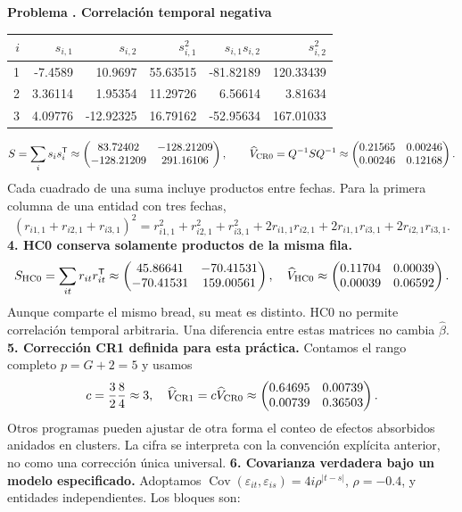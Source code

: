 \documentclass[11pt,a4paper]{article}
\newcommand{\T}{^{\mathsf T}}
\DeclareMathOperator{\Cov}{Cov}
\theoremstyle{definition}
\newcounter{problema}
\newenvironment{resuelto}[1]{\refstepcounter{problema}\par\medskip\Needspace{6\baselineskip}\textbf{Problema \theproblema. #1}\par}{\par\medskip}
\newcommand{\eps}{\varepsilon}
\begin{document}
\begin{resuelto}{Correlación temporal negativa}
\begin{center}\small
\begin{tabular}{rrrrrr}
\toprule
$i$&$s_{i,1}$&$s_{i,2}$&$s_{i,1}^2$&$s_{i,1}s_{i,2}$&$s_{i,2}^2$\\
\midrule
1&-7.4589&10.9697&55.63515&-81.82189&120.33439\\
2&3.36114&1.95354&11.29726&6.56614&3.81634\\
3&4.09776&-12.92325&16.79162&-52.95634&167.01033\\
\bottomrule
\end{tabular}
\end{center}
\[
S=\sum_i s_is_i\T\approx\begin{pmatrix}
83.72402&-128.21209\\-128.21209&291.16106
\end{pmatrix},\qquad \widehat V_{\rm CR0}=Q^{-1}SQ^{-1}\approx\begin{pmatrix}
0.21565&0.00246\\0.00246&0.12168
\end{pmatrix}.
\]
Cada cuadrado de una suma incluye productos entre fechas. Para la primera columna de una entidad con tres fechas,
\[
(r_{i1,1}+r_{i2,1}+r_{i3,1})^2
=r_{i1,1}^2+r_{i2,1}^2+r_{i3,1}^2
+2r_{i1,1}r_{i2,1}+2r_{i1,1}r_{i3,1}+2r_{i2,1}r_{i3,1}.
\]
\textbf{4. HC0 conserva solamente productos de la misma fila.}
\[
S_{\rm HC0}=\sum_{it}r_{it}r_{it}\T\approx\begin{pmatrix}
45.86641&-70.41531\\-70.41531&159.00561
\end{pmatrix},\quad
\widehat V_{\rm HC0}\approx\begin{pmatrix}
0.11704&0.00039\\0.00039&0.06592
\end{pmatrix}.
\]
Aunque comparte el mismo bread, su meat es distinto. HC0 no permite correlación temporal arbitraria. Una diferencia entre estas matrices no cambia $\widehat\beta$.
\textbf{5. Corrección CR1 definida para esta práctica.} Contamos el rango completo $p=G+2=5$ y usamos
\[
c=\frac{3}{2}\frac{8}{4}\approx3,\quad \widehat V_{\rm CR1}=c\widehat V_{\rm CR0}\approx\begin{pmatrix}
0.64695&0.00739\\0.00739&0.36503
\end{pmatrix}.
\]
Otros programas pueden ajustar de otra forma el conteo de efectos absorbidos anidados en clusters. La cifra se interpreta con la convención explícita anterior, no como una corrección única universal.
\textbf{6. Covarianza verdadera bajo un modelo especificado.} Adoptamos $\Cov(\eps_{it},\eps_{is})=4i\rho^{|t-s|}$, $\rho=-0.4$, y entidades independientes. Los bloques son:

\end{resuelto}
\end{document}
